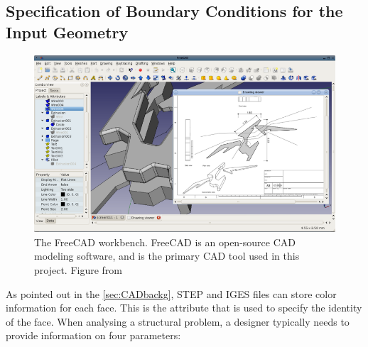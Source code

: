 \subsection{Specification of Boundary Conditions for the Input Geometry}
\label{sec: GeomCreation}

\begin{figure}
\centering
  \includegraphics[scale=0.75]{Pictures/CADToVoxel/FreeCAD.png}
\caption{The FreeCAD workbench. FreeCAD is an open-source CAD modeling software, and is the primary CAD tool used in this project. Figure from\cite{FreeCAD}}
\label{fig: freeCAD}
\end{figure}

As pointed out in the \ref{sec:CADbackg}, STEP and IGES files can store color information for each face. This is the attribute that is used to specify the identity of the face. When analysing a structural problem, a designer typically needs to provide information on four parameters:

